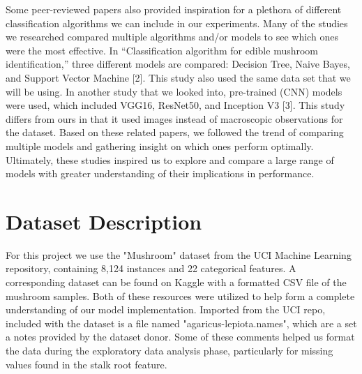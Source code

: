 \documentclass[11pt, conference]{IEEEtran}
\begin{document}
    Some peer-reviewed papers also provided inspiration for a plethora of different classification algorithms we can include in our experiments. Many of the studies we researched compared multiple algorithms and/or models to see which ones were the most effective. In “Classification algorithm for edible mushroom identification,” three different models are compared: Decision Tree, Naive Bayes, and Support Vector Machine [2]. This study also used the same data set that we will be using. In another study that we looked into, pre-trained (CNN) models were used, which included VGG16, ResNet50, and Inception V3 [3]. This study differs from ours in that it used images instead of macroscopic observations for the dataset. Based on these related papers, we followed the trend of comparing multiple models and gathering insight on which ones perform optimally. Ultimately, these studies inspired us to explore and compare a large range of models with greater understanding of their implications in performance.

\section{Dataset Description}
    For this project we use the "Mushroom" dataset from the UCI Machine Learning repository, containing 8,124 instances and 22 categorical features. A corresponding dataset can be found on Kaggle with a formatted CSV file of the mushroom samples. Both of these resources were utilized to help form a complete understanding of our model implementation. Imported from the UCI repo, included with the dataset is a file named "agaricus-lepiota.names", which are a set a notes provided by the dataset donor. Some of these comments helped us format the data during the exploratory data analysis phase, particularly for missing values found in the stalk root feature.
\end{document}
